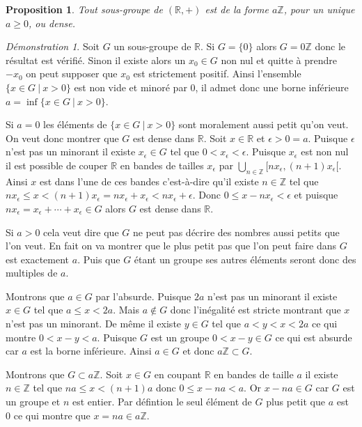 \documentclass[a4paper, 11pt, french]{book}
\newenvironment{itemise}{\itemize}{\enditemize}
\theoremstyle{plain} %
\newtheorem{proposition}{Proposition}
\theoremstyle{definition} %
\theoremstyle{remark} %
\newtheorem*{demonstration}{Démonstration}
\newcommand{\1}{\mathds{1}}
\newcommand{\infegal}{\leqslant}
\newcommand{\supegal}{\geqslant}
\newcommand{\Z}{\mathbb{Z}}
\newcommand{\R}{\mathbb{R}}
\begin{document}
\begin{proposition}
	Tout sous-groupe de $(\R, +)$ est de la forme $a\Z$, pour un unique $a\supegal0$, ou dense.
\end{proposition}

\begin{demonstration}
	Soit $G$ un sous-groupe de $\R$.
	Si $G = \{ 0 \}$ alors $G = 0\Z$ donc le résultat est vérifié.
	Sinon il existe alors un $x_0\in G$ non nul et quitte à prendre $-x_0$ on peut supposer que $x_0$ est strictement positif.
	Ainsi l’ensemble $\{x\in G \ | \ x > 0\}$ est non vide et minoré par 0, il admet donc une borne inférieure $a=\inf\{x\in G \ | \ x > 0\}$.
	\begin{itemise}
		\item Si $a = 0$ les éléments de $\{x\in G \ | \ x > 0\}$ sont moralement aussi petit qu'on veut.
		On veut donc montrer que $G$ est dense dans $\R$.
		Soit $x\in\R$ et $\epsilon > 0 = a$.
		Puisque $\epsilon$ n'est pas un minorant il existe $x_\epsilon\in G$ tel que $0 < x_\epsilon < \epsilon$.
		Puisque $x_\epsilon$ est non nul il est possible de couper $\R$ en bandes de tailles $x_\epsilon$ par $\bigcup_{n\in\Z}[nx_\epsilon, (n+1)x_\epsilon[$.
		Ainsi $x$ est dans l'une de ces bandes c'est-à-dire qu'il existe $n\in\Z$ tel que $nx_\epsilon\infegal x < (n + 1)x_\epsilon=nx_\epsilon + x_\epsilon < nx_\epsilon + \epsilon$.
		Donc $0\infegal x - nx_\epsilon < \epsilon$ et puisque $nx_\epsilon = x_\epsilon + \cdots + x_\epsilon\in G$ alors $G$ est dense dans $\R$.
		\item Si $a>0$ cela veut dire que $G$ ne peut pas décrire des nombres aussi petits que l'on veut.
		En fait on va montrer que le plus petit pas que l'on peut faire dans $G$ est exactement $a$.
		Puis que $G$ étant un groupe ses autres éléments seront donc des multiples de $a$.
		\begin{itemise}
			\item Montrons que $a\in G$ par l'absurde.
			Puisque $2a$ n'est pas un minorant il existe $x\in G$ tel que $a \infegal x < 2a$.
			Mais $a\notin G$ donc l'inégalité est stricte montrant que $x$ n'est pas un minorant.
			De même il existe $y\in G$ tel que $a < y < x < 2a$ ce qui montre $0 < x - y < a$.
			Puisque $G$ est un groupe $0 < x - y\in G$ ce qui est absurde car $a$ est la borne inférieure.
			Ainsi $a\in G$ et donc $a\Z\subset G$.
			\item Montrons que $G\subset a\Z$.
			Soit $x\in G$ en coupant $\R$ en bandes de taille $a$ il existe $n\in\Z$ tel que $na\infegal x<(n+1)a$ donc $0\infegal x - na < a$.
			Or $x - na\in G$ car $G$ est un groupe et $n$ est entier.
			Par défintion le seul élément de $G$ plus petit que $a$ est $0$ ce qui montre que $x=na\in a\Z$.
		\end{itemise}
	\end{itemise}
\end{demonstration}
\end{document}
